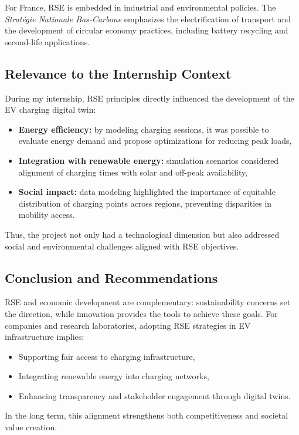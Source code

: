 For France, RSE is embedded in industrial and environmental policies. The \textit{Stratégie Nationale Bas-Carbone} emphasizes the electrification of transport and the development of circular economy practices, including battery recycling and second-life applications.

\subsection*{Relevance to the Internship Context}
During my internship, RSE principles directly influenced the development of the EV charging digital twin:
\begin{itemize}
    \item \textbf{Energy efficiency:} by modeling charging sessions, it was possible to evaluate energy demand and propose optimizations for reducing peak loads,
    \item \textbf{Integration with renewable energy:} simulation scenarios considered alignment of charging times with solar and off-peak availability,
    \item \textbf{Social impact:} data modeling highlighted the importance of equitable distribution of charging points across regions, preventing disparities in mobility access.
\end{itemize}

Thus, the project not only had a technological dimension but also addressed social and environmental challenges aligned with RSE objectives.

\subsection*{Conclusion and Recommendations}
RSE and economic development are complementary: sustainability concerns set the direction, while innovation provides the tools to achieve these goals.  
For companies and research laboratories, adopting RSE strategies in EV infrastructure implies:
\begin{itemize}
    \item Supporting fair access to charging infrastructure,
    \item Integrating renewable energy into charging networks,
    \item Enhancing transparency and stakeholder engagement through digital twins.
\end{itemize}
In the long term, this alignment strengthens both competitiveness and societal value creation.




